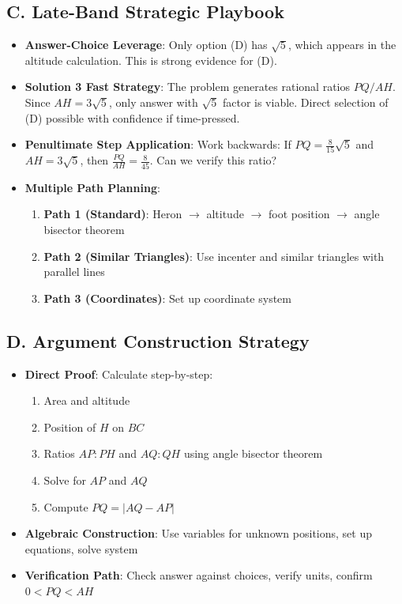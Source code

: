 \documentclass[12pt]{article}
\begin{document}
\begin{strategicbox}
\subsection*{C. Late-Band Strategic Playbook}
\begin{itemize}[leftmargin=*]
    \item \textbf{Answer-Choice Leverage}: Only option (D) has $\sqrt{5}$, which appears in the altitude calculation. This is strong evidence for (D).
    \item \textbf{Solution 3 Fast Strategy}: The problem generates rational ratios $PQ/AH$. Since $AH = 3\sqrt{5}$, only answer with $\sqrt{5}$ factor is viable. Direct selection of (D) possible with confidence if time-pressed.
    \item \textbf{Penultimate Step Application}: Work backwards: If $PQ = \frac{8}{15}\sqrt{5}$ and $AH = 3\sqrt{5}$, then $\frac{PQ}{AH} = \frac{8}{45}$. Can we verify this ratio?
    \item \textbf{Multiple Path Planning}: 
    \begin{enumerate}
        \item \textbf{Path 1 (Standard)}: Heron $\rightarrow$ altitude $\rightarrow$ foot position $\rightarrow$ angle bisector theorem
        \item \textbf{Path 2 (Similar Triangles)}: Use incenter and similar triangles with parallel lines
        \item \textbf{Path 3 (Coordinates)}: Set up coordinate system
    \end{enumerate}
\end{itemize}

\subsection*{D. Argument Construction Strategy}
\begin{itemize}[leftmargin=*]
    \item \textbf{Direct Proof}: Calculate step-by-step:
    \begin{enumerate}
        \item Area and altitude
        \item Position of $H$ on $BC$
        \item Ratios $AP:PH$ and $AQ:QH$ using angle bisector theorem
        \item Solve for $AP$ and $AQ$
        \item Compute $PQ = |AQ - AP|$
    \end{enumerate}
    \item \textbf{Algebraic Construction}: Use variables for unknown positions, set up equations, solve system
    \item \textbf{Verification Path}: Check answer against choices, verify units, confirm $0 < PQ < AH$
\end{itemize}
\end{strategicbox}
\end{document}

